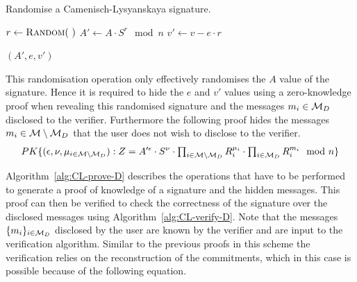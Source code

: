 \begin{algorithm}
  \caption{Randomise a Camenisch-Lysyanskaya signature.}
  \label{alg:CL-randomise}
  \addtolength{\baselineskip}{1mm}
  \begin{algorithmic}[1]
      \State $r \gets \Call{Random}{~}$
      \State $A' \gets A \cdot S^r \mod n$
      \State $v' \gets v - e \cdot r$

      \Return $(A', e, v')$
    \EndFunction
  \end{algorithmic}
\end{algorithm}

This randomisation operation only effectively randomises the $A$ value of the
signature. Hence it is required to hide the $e$ and $v'$ values using a
zero-knowledge proof when revealing this randomised signature and the messages
$m_i \in \mathcal{M}_D$ disclosed to the verifier. Furthermore the following proof hides the messages
$m_i \in \mathcal{M} \setminus \mathcal{M}_D$ that the user does not wish to disclose to the
verifier.
\begin{equation*}
  PK\{(\epsilon, \nu, \mu_{i \in \mathcal{M} \setminus \mathcal{M}_D}) :
    Z = A'^{\epsilon} \cdot S^{\nu}
    \cdot \textstyle\prod_{i \in \mathcal{M} \setminus \mathcal{M}_D} R_i^{\mu_i}
    \cdot \textstyle\prod_{i \in \mathcal{M}_D} R_i^{m_i} \mod n \}
\end{equation*}

Algorithm~\ref{alg:CL-prove-D} describes the operations that have to be
performed to generate a proof of knowledge of a signature and the hidden
messages. This proof can then be verified to check the correctness of the
signature over the disclosed messages using Algorithm~\ref{alg:CL-verify-D}.
Note that the messages $\{m_i\}_{i \in \mathcal{M}_D}$ disclosed by the user are known
by the verifier and are input to the verification algorithm. Similar to the
previous proofs in this scheme the verification relies on the reconstruction of
the commitments, which in this case is possible because of the following
equation.

